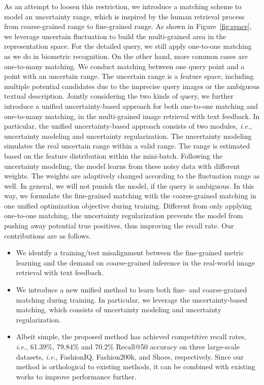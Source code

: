 \documentclass[10pt,twocolumn,letterpaper]{article}
\def\ie{\emph{i.e.}}
\begin{document}
As an attempt to loosen this restriction, we introduce a matching scheme to model an uncertainty range, which is inspired by the human retrieval process from coarse-grained range to fine-grained range. 
As shown in Figure~\ref{fig:space}, we leverage uncertain fluctuation to build the multi-grained area in the representation space. 
For the detailed query, we still apply one-to-one matching as we do in biometric recognition. On the other hand, more common cases are one-to-many matching. We conduct matching between one query point and a point with an uncertain range. The uncertain range is a feature space, including multiple potential candidates due to the imprecise query images or the ambiguous textual description. Jointly considering the two kinds of query, we further introduce a unified uncertainty-based approach for both one-to-one matching and one-to-many matching, in the multi-grained image retrieval with text feedback. 
In particular, the unified uncertainty-based approach consists of two modules, \ie, uncertainty modeling and uncertainty regularization. 
The uncertainty modeling simulates the real uncertain range within a valid range. The range is estimated based on the feature distribution within the mini-batch. 
Following the uncertainty modeling, the model learns from these noisy data with different weights. The weights are adaptively changed according to the fluctuation range as well. In general, we will not punish the model, if the query is ambiguous. In this way, we formulate the fine-grained matching with the coarse-grained matching in one unified optimization objective during training. Different from only applying one-to-one matching, the uncertainty regularization prevents the model from pushing away potential true positives, thus improving the recall rate.  
Our contributions are as follows. 
\begin{itemize}
\vspace{-2mm}
    \item We identify a training/test misalignment between the fine-grained metric learning and the demand on coarse-grained inference in the real-world image retrieval with text feedback. 
\vspace{-2mm}
    \item  We introduce a new unified method to learn both fine- and coarse-grained matching during training. In particular, we leverage the uncertainty-based matching, which consists of uncertainty modeling and uncertainty regularization.  
\vspace{-2mm}
    \item Albeit simple, the proposed method has achieved competitive recall rates, \ie, 61.39\%, 79.84\% and 70.2\% Recall@50 accuracy on three large-scale datasets, \ie, FashionIQ, Fashion200k, and Shoes, respectively. Since our method is orthological to existing methods, it can be combined with existing works to improve performance further.
\end{itemize}
\end{document}
